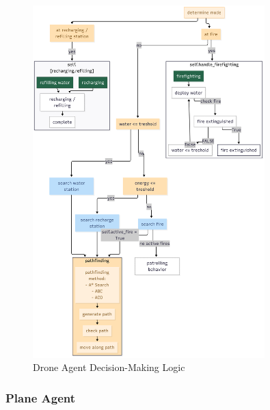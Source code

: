 \documentclass[twoside]{article}
\begin{document}
\begin{figure}[!htbp]
  \centering
  \includegraphics[width=0.8\textwidth]{figures/DroneAgent_Logic.png}
  \caption{Drone Agent Decision-Making Logic}
  \label{fig:droneAgentlogic}
\end{figure}

\newpage
\subsubsection{Plane Agent}
\label{sec:PlaneAgent}
\end{document}
